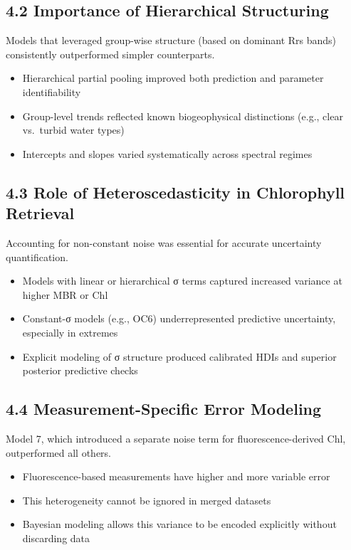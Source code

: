 \documentclass[
]{agujournal2019}
\providecommand{\tightlist}{%
  \setlength{\itemsep}{0pt}\setlength{\parskip}{0pt}}\usepackage{longtable,booktabs,array}
\begin{document}
\subsection{4.2 Importance of Hierarchical
Structuring}\label{importance-of-hierarchical-structuring}

Models that leveraged group-wise structure (based on dominant Rrs bands)
consistently outperformed simpler counterparts.

\begin{itemize}
\tightlist
\item
  Hierarchical partial pooling improved both prediction and parameter
  identifiability
\item
  Group-level trends reflected known biogeophysical distinctions (e.g.,
  clear vs.~turbid water types)
\item
  Intercepts and slopes varied systematically across spectral regimes
\end{itemize}

\subsection{4.3 Role of Heteroscedasticity in Chlorophyll
Retrieval}\label{role-of-heteroscedasticity-in-chlorophyll-retrieval}

Accounting for non-constant noise was essential for accurate uncertainty
quantification.

\begin{itemize}
\tightlist
\item
  Models with linear or hierarchical σ terms captured increased variance
  at higher MBR or Chl
\item
  Constant-σ models (e.g., OC6) underrepresented predictive uncertainty,
  especially in extremes
\item
  Explicit modeling of σ structure produced calibrated HDIs and superior
  posterior predictive checks
\end{itemize}

\subsection{4.4 Measurement-Specific Error
Modeling}\label{measurement-specific-error-modeling}

Model 7, which introduced a separate noise term for fluorescence-derived
Chl, outperformed all others.

\begin{itemize}
\tightlist
\item
  Fluorescence-based measurements have higher and more variable error
\item
  This heterogeneity cannot be ignored in merged datasets
\item
  Bayesian modeling allows this variance to be encoded explicitly
  without discarding data
\end{itemize}
\end{document}

